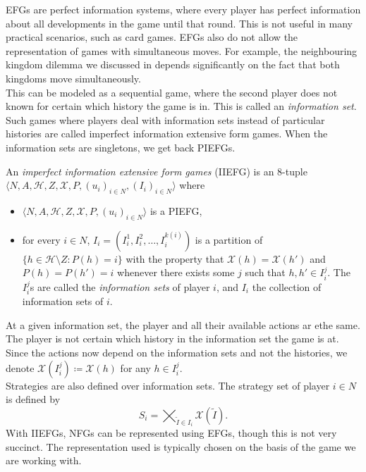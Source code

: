 	EFGs are perfect information systems, where every player has perfect information about all developments in the game until that round. This is not useful in many practical scenarios, such as card games. EFGs also do not allow the representation of games with simultaneous moves. For example, the neighbouring kingdom dilemma we discussed in  depends significantly on the fact that both kingdoms move simultaneously.\\
	This can be modeled as a sequential game, where the second player does not known for certain which history the game is in. This is called an \emph{information set}. Such games where players deal with information sets instead of particular histories are called imperfect information extensive form games. When the information sets are singletons, we get back PIEFGs.

	\begin{fdef}
		An \emph{imperfect information extensive form games} (IIEFG) is an $8$-tuple $\langle N,A,\mathcal{H},Z,\mathcal{X},P,(u_i)_{i\in N},(I_i)_{i \in N}\rangle$ where
		\begin{itemize}
			\item $\langle N,A,\mathcal{H},Z,\mathcal{X},P,(u_i)_{i\in N}\rangle$ is a PIEFG,
			\item for every $i \in N$, $I_i = (I_i^1,I_i^2,\ldots,I_i^{k(i)})$ is a partition of $\{ h \in \mathcal{H} \setminus Z : P(h) = i \}$ with the property that $\mathcal{X}(h) = \mathcal{X}(h')$ and $P(h) = P(h') = i$ whenever there exists some $j$ such that $h,h' \in I_i^j$. The $I_i^j$s are called the \emph{information sets} of player $i$, and $I_i$ the collection of information sets of $i$.
		\end{itemize}
	\end{fdef}

	At a given information set, the player and all their available actions ar ethe same. The player is not certain which history in the information set the game is at.\\
	Since the actions now depend on the information sets and not the histories, we denote $\mathcal{X}(I_i^j) \coloneqq \mathcal{X}(h)$ for any $h \in I_i^j$.\\
	Strategies are also defined over information sets. The strategy set of player $i \in N$ is defined by
	\[ S_i = \bigtimes_{\tilde{I} \in I_i} \mathcal{X}(\tilde{I}). \]
	With IIEFGs, NFGs can be represented using EFGs, though this is not very succinct. The representation used is typically chosen on the basis of the game we are working with.

